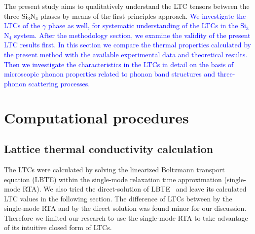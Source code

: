 \documentclass[twocolumn,amsmath,amssymb,a4paper,prb,superscriptaddress,floatfix]{revtex4-1}
\begin{document}
The present study aims to qualitatively understand the LTC tensors between
the three Si$_3$N$_4$ phases by means of the first principles approach.
\textcolor{blue}{We investigate the LTCs of  the $\gamma$
phase as well, for systematic understanding of the LTCs in the Si$_3$N$_4$
system.  After the methodology section, we examine the validity of the
present LTC results first.  In this section we compare the thermal
properties calculated by the present method with the available experimental
data and theoretical results.  Then we investigate the
characteristics in the LTCs in detail on the basis of microscopic phonon
properties related to phonon band structures and three-phonon scattering
processes.}

\section{Computational procedures}

\subsection{Lattice thermal conductivity calculation}

The LTCs were calculated by solving the linearized Boltzmann transport equation
(LBTE) within the single-mode relaxation time approximation (single-mode RTA).
We also tried the direct-solution of LBTE~\cite{chaput-direct} and
leave its calculated LTC values in the following section. The
difference of LTCs between by the single-mode RTA and by the direct solution
was found minor for our discussion. Therefore we limited our research to use
the single-mode RTA to take advantage of its intuitive closed form of LTCs.
\end{document}
